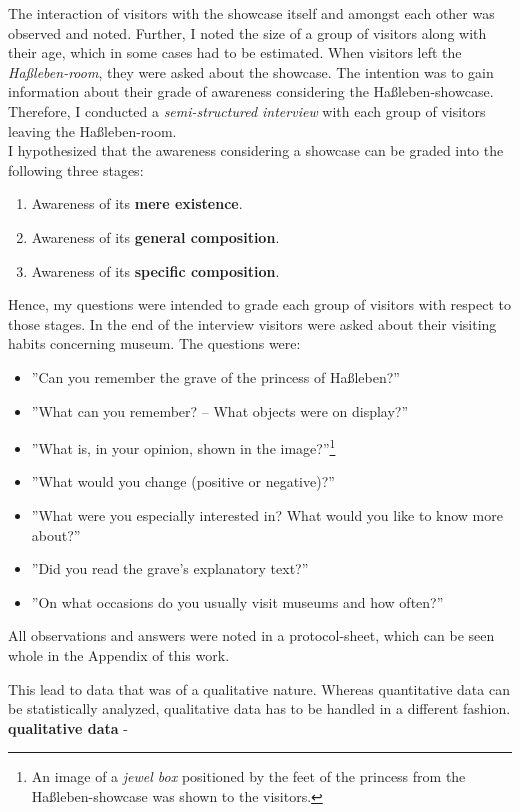 The interaction of visitors with the showcase itself and amongst each other was observed and noted. Further, I noted the size of a group of visitors along with their age, which in some cases had to be estimated. When visitors left the \textit{Haßleben-room}, they were asked about the showcase. The intention was to gain information about their grade of awareness considering the Haßleben-showcase. Therefore, I conducted a \textit{semi-structured interview} with each group of visitors leaving the Haßleben-room. 
\\
I hypothesized that the awareness considering a showcase can be graded into the following three stages:

\begin{enumerate}
	\item Awareness of its \textbf{mere existence}.
	\item Awareness of its \textbf{general composition}.
	\item Awareness of its \textbf{specific composition}.
\end{enumerate} 
 
Hence, my questions were intended to grade each group of visitors with respect to those stages. In the end of the interview visitors were asked about their visiting habits concerning museum. The questions were:

\begin{itemize}
	\item ''Can you remember the grave of the princess of Haßleben?''
	\item ''What can you remember? -- What objects were on display?''
	\item ''What is, in your opinion, shown in the image?''\footnote{An image of a \textit{jewel box} positioned by the feet of the princess from the Haßleben-showcase was shown to the visitors.}
	\item ''What would you change (positive or negative)?''
	\item ''What were you especially interested in? What would you like to know more about?''
	\item ''Did you read the grave's explanatory text?''
	\item ''On what occasions do you usually visit museums and how often?''
\end{itemize}

All observations and answers were noted in a protocol-sheet, which can be seen whole in the Appendix of this work. 

This lead to data that was of a qualitative nature. Whereas quantitative data can be statistically analyzed, qualitative data has to be handled in a different fashion. \textbf{qualitative data} - ~\cite{GroundedTheory}

